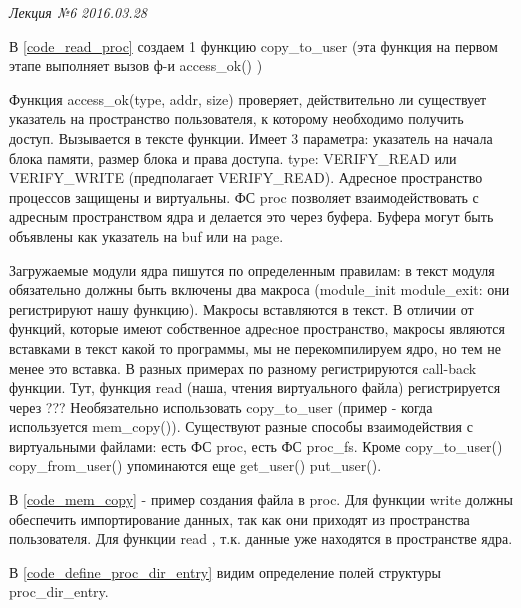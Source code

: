 \clearpage
\begin{flushright}
	\textit{Лекция №6}
	\textit{2016.03.28}
\end{flushright}

 

В \ref{code_read_proc} создаем 1 функцию copy\_to\_user (эта функция на первом этапе выполняет вызов ф-и access\_ok() )

Функция access\_ok(type, addr, size)   проверяет, действительно ли существует указатель на пространство пользователя, к которому необходимо получить доступ. Вызывается в тексте функции. Имеет 3 параметра: указатель на начала блока памяти, размер блока и права доступа. type: VERIFY\_READ  или VERIFY\_WRITE (предполагает  VERIFY\_READ). Адресное пространство процессов защищены и виртуальны. ФС proc позволяет взаимодействовать с адресным пространством ядра и делается это через буфера. Буфера могут быть объявлены как указатель на buf или на page. 

Загружаемые модули ядра пишутся по определенным правилам: в текст модуля обязательно должны быть включены два макроса (module\_init module\_exit: они регистрируют нашу функцию). Макросы вставляются в текст. В отличии от функций, которые имеют собственное адреcное пространство, макросы являются вставками в текст какой то программы, мы не перекомпилируем ядро, но тем не менее это вставка. В разных примерах по разному регистрируются call-back функции. Тут, функция read (наша, чтения виртуального файла) регистрируется через ???
Необязательно использовать copy\_to\_user (пример - когда используется mem\_copy()).  Существуют разные способы взаимодействия с виртуальными файлами: есть ФС proc, есть ФС proc\_fs.
Кроме copy\_to\_user() copy\_from\_user() упоминаются еще get\_user() put\_user().

 

В \ref{code_mem_copy} - пример создания файла в proc. Для функции write должны обеспечить импортирование данных, так как они приходят из пространства пользователя. Для функции read , т.к. данные уже находятся в пространстве ядра. 



В \ref{code_define_proc_dir_entry} видим определение полей структуры proc\_dir\_entry.

